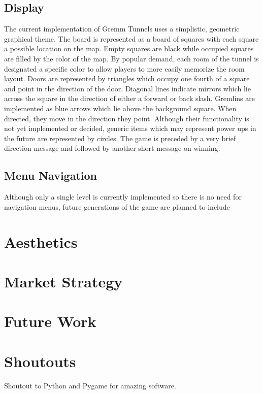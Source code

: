 \documentclass{scrreprt}
\begin{document}
		\section{Display}
			The current implementation of Gremm Tunnels uses a simplistic, geometric graphical theme. The board is represented as a board of squares with each square a possible location on the map. Empty squares are black while occupied squares are filled by the color of the map. By popular demand, each room of the tunnel is designated a specific color to allow players to more easily memorize the room layout. Doors are represented by triangles which occupy one fourth of a square and point in the direction of the door. Diagonal lines indicate mirrors which lie across the square in the direction of either a forward or back slash. Gremlins are implemented as blue arrows which lie above the background square. When directed, they move in the direction they point. Although their functionality is not yet implemented or decided, generic items which may represent power ups in the future are represented by circles. The game is preceded by a very brief direction message and followed by another short message on winning.
		
		\section{Menu Navigation}
			Although only a single level is currently implemented so there is no need for navigation menus, future generations of the game are planned to include 
		
	\chapter{Aesthetics}
		
	\chapter{Market Strategy}
		
	\chapter{Future Work}
		
	\chapter{Shoutouts}
		Shoutout to Python and Pygame for amazing software.
		
\end{document}
